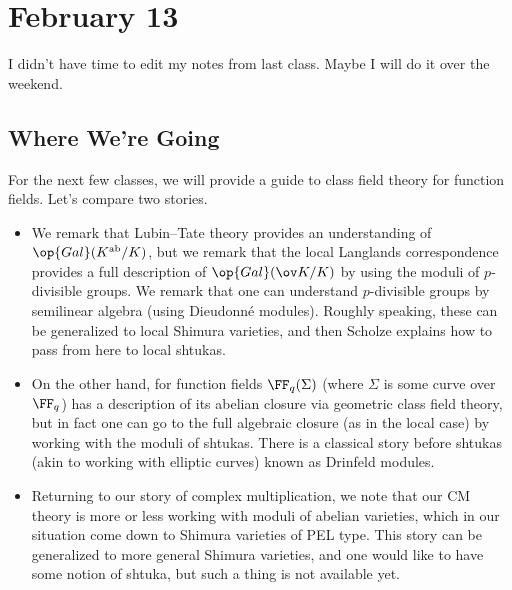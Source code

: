\documentclass[../notes.tex]{subfiles}
\begin{document}
\section{February 13}

I didn't have time to edit my notes from last class. Maybe I will do it over the weekend.

\subsection{Where We're Going}
For the next few classes, we will provide a guide to class field theory for function fields. Let's compare two stories.
\begin{itemize}
	\item We remark that Lubin--Tate theory provides an understanding of $\op{Gal}(K^{\mathrm{ab}}/K)$, but we remark that the local Langlands correspondence provides a full description of $\op{Gal}(\ov K/K)$ by using the moduli of $p$-divisible groups. We remark that one can understand $p$-divisible groups by semilinear algebra (using Dieudonn\'e modules). Roughly speaking, these can be generalized to local Shimura varieties, and then Scholze explains how to pass from here to local shtukas.
	\item On the other hand, for function fields $\FF_q(\Sigma)$ (where $\Sigma$ is some curve over $\FF_q$) has a description of its abelian closure via geometric class field theory, but in fact one can go to the full algebraic closure (as in the local case) by working with the moduli of shtukas. There is a classical story before shtukas (akin to working with elliptic curves) known as Drinfeld modules.
	\item Returning to our story of complex multiplication, we note that our CM theory is more or less working with moduli of abelian varieties, which in our situation come down to Shimura varieties of PEL type. This story can be generalized to more general Shimura varieties, and one would like to have some notion of shtuka, but such a thing is not available yet.
\end{itemize}
\end{document}
